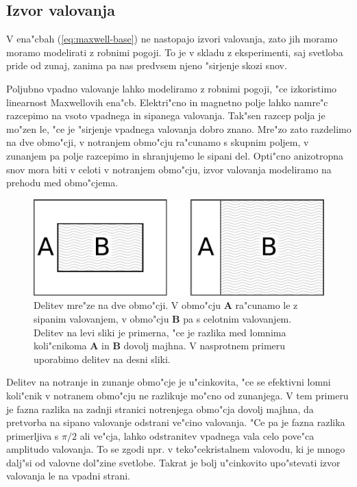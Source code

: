 \documentclass[a4paper,10pt]{article}
\begin{document}
\subsection{Izvor valovanja}

V ena"cbah (\ref{eq:maxwell-base}) ne nastopajo izvori valovanja, zato jih moramo moramo modelirati z robnimi pogoji. 
To je v skladu z eksperimenti, saj svetloba pride od zunaj, zanima pa nas predvsem njeno "sirjenje skozi snov. 

Poljubno vpadno valovanje lahko modeliramo z robnimi pogoji, "ce izkoristimo linearnost Maxwellovih ena"cb. 
Elektri"cno in magnetno polje lahko namre"c razcepimo na vsoto vpadnega in sipanega valovanja\cite{taflove}. 
Tak"sen razcep polja je mo"zen le, "ce je "sirjenje vpadnega valovanja dobro znano. 
Mre"zo zato razdelimo na dve obmo"cji, v notranjem obmo"cju ra"cunamo s skupnim poljem, v zunanjem pa polje razcepimo in shranjujemo le sipani del.
Opti"cno anizotropna snov mora biti v celoti v notranjem obmo"cju, izvor valovanja modeliramo na prehodu med obmo"cjema. 

\begin{figure}[h]
 \centering
 \includegraphics[width=.8\textwidth]{./Slike/wave-source-regions}
 \caption{Delitev mre"ze na dve obmo"cji. V obmo"cju \textbf{A} ra"cunamo le z sipanim valovanjem, v obmo"cju \textbf{B} pa s celotnim valovanjem. Delitev na levi sliki je primerna, "ce je razlika med lomnima koli"cnikoma \textbf{A} in \textbf{B} dovolj majhna. V nasprotnem primeru uporabimo delitev na desni sliki. }
 \label{fig:wave-source-regions}
\end{figure}

Delitev na notranje in zunanje obmo"cje je u"cinkovita, "ce se efektivni lomni koli"cnik v notranem obmo"cju ne razlikuje mo"cno od zunanjega. 
V tem primeru je fazna razlika na zadnji stranici notrenjega obmo"cja dovolj majhna, da pretvorba na sipano valovanje odstrani ve"cino valovanja. 
"Ce pa je fazna razlika primerljiva s $\pi/2$ ali ve"cja, lahko odstranitev vpadnega vala celo pove"ca amplitudo valovanja. 
To se zgodi npr. v teko"cekristalnem valovodu, ki je mnogo dalj"si od valovne dol"zine svetlobe. 
Takrat je bolj u"cinkovito upo"stevati izvor valovanja le na vpadni strani. 
\end{document}
